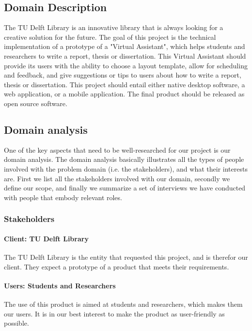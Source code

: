 \subsection{Domain Description} %
\label{sub:problem_description}

The TU Delft Library is an innovative library that is always looking for a creative solution for the future. The goal of this project is the technical implementation of a prototype of a "Virtual Assistant", which helps students and researchers to write a report, thesis or dissertation. This Virtual Assistant should provide its users with the ability to choose a layout template, allow for scheduling and feedback, and give suggestions or tips to users about how to write a report, thesis or dissertation.
This project should entail either native desktop software, a web application, or a mobile application. The final product should be released as open source software.

\subsection{Domain analysis} %

One of the key aspects that need to be well-researched for our project is our domain analysis. The domain analysis basically illustrates all the types of people involved with the problem domain (i.e. the stakeholders), and what their interests are. First we list all the stakeholders involved with our domain, secondly we define our scope, and finally we summarize a set of interviews we have conducted with people that embody relevant roles.

\subsubsection{Stakeholders} %

\paragraph{Client: TU Delft Library} The TU Delft Library is the entity that requested this project, and is therefor our client. They expect a prototype of a product that meets their requirements.

\paragraph{Users: Students and Researchers} The use of this product is aimed at students and researchers, which makes them our users. It is in our best interest to make the product as user-friendly as possible.


